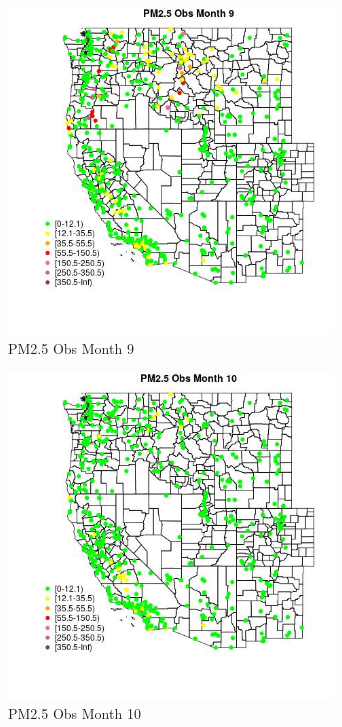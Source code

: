 \begin{figure} 
\centering  
\includegraphics[width=0.77\textwidth]{Code_Outputs/Report_ML_input_PM25_Step4_part_e_de_duplicated_aves_compiled_2019-05-14wNAs_MapObsMo9PM25_Obs.jpg} 
\caption{\label{fig:Report_ML_input_PM25_Step4_part_e_de_duplicated_aves_compiled_2019-05-14wNAsMapObsMo9PM25_Obs}PM2.5 Obs Month 9} 
\end{figure} 
 

\begin{figure} 
\centering  
\includegraphics[width=0.77\textwidth]{Code_Outputs/Report_ML_input_PM25_Step4_part_e_de_duplicated_aves_compiled_2019-05-14wNAs_MapObsMo10PM25_Obs.jpg} 
\caption{\label{fig:Report_ML_input_PM25_Step4_part_e_de_duplicated_aves_compiled_2019-05-14wNAsMapObsMo10PM25_Obs}PM2.5 Obs Month 10} 
\end{figure} 
 

